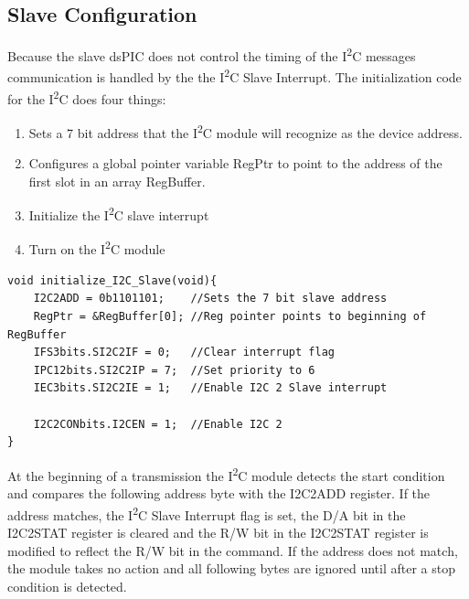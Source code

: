 \documentclass{article}
\begin{document}
\subsection{Slave Configuration}
Because the slave dsPIC does not control the timing of the I\textsuperscript{2}C messages communication is handled by the the I\textsuperscript{2}C Slave Interrupt. The initialization code for the I\textsuperscript{2}C does four things:
\begin{enumerate}
\item{Sets a 7 bit address that the I\textsuperscript{2}C module will recognize as the device address.}
\item{Configures a global pointer variable RegPtr to point to the address of the first slot in an array RegBuffer.}
\item{Initialize the I\textsuperscript{2}C slave interrupt}
\item{Turn on the I\textsuperscript{2}C module}
\end{enumerate}

\begin{lstlisting}[xleftmargin=\parindent,frame=L]
void initialize_I2C_Slave(void){
    I2C2ADD = 0b1101101;    //Sets the 7 bit slave address
    RegPtr = &RegBuffer[0]; //Reg pointer points to beginning of RegBuffer
    IFS3bits.SI2C2IF = 0;   //Clear interrupt flag
    IPC12bits.SI2C2IP = 7;  //Set priority to 6
    IEC3bits.SI2C2IE = 1;   //Enable I2C 2 Slave interrupt

    I2C2CONbits.I2CEN = 1;  //Enable I2C 2
}
\end{lstlisting}

At the beginning of a transmission the I\textsuperscript{2}C module detects the start condition and compares the following address byte with the I2C2ADD register. If the address matches, the I\textsuperscript{2}C Slave Interrupt flag is set, the D/A bit in the I2C2STAT register is cleared and the R/W bit in the I2C2STAT register is modified to reflect the R/W bit in the command. If the address does not match, the module takes no action and all following bytes are ignored until after a stop condition is detected.

 
\end{document}
